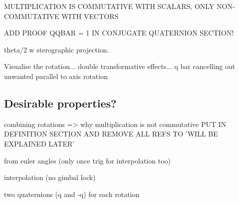 \documentclass[10pt]{article}
\begin{document}
MULTIPLICATION IS COMMUTATIVE WITH SCALARS, ONLY NON-COMMUTATIVE WITH VECTORS

ADD PROOF QQBAR = 1 IN CONJUGATE QUATERNION SECTION!

theta/2 w sterographic projection.

Visualise the rotation... double transformative effects...
q bar cancelling out unwanted parallel to axis rotation

\subsection{Desirable properties?}

combining rotations => why multiplication is not commutative PUT IN DEFINITION SECTION AND REMOVE ALL REFS TO 'WILL BE EXPLAINED LATER'

from euler angles (only once trig for interpolation too)

interpolation (no gimbal lock)

two quaternions (q and -q) for each rotation

\pagebreak

\printbibliography
\end{document}
